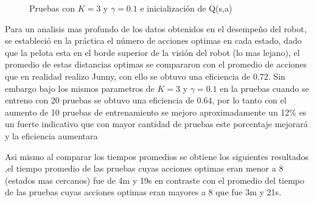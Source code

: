 \begin{figure}[h]
\caption{Pruebas con $K = 3$ y $ \gamma = 0.1 $ e inicializaci\'on de Q(s,a)}
\label{fig:mejor}
\end{figure} 

Para un analisis mas profundo de los datos obtenidos en el desempeño del robot, se estableci\'o en la pr\'actica el n\'umero de acciones optimas en cada estado, dado que la pelota esta en el borde superior de la visi\'on del robot (lo mas lejano), el promedio de estas distancias optimas se compararon con el promedio de acciones que en realidad realizo Junny, con ello se obtuvo una eficiencia de $ 0.72$. Sin embargo bajo los mismos parametros de  $K = 3$ y $ \gamma = 0.1 $ en la pruebas cuando se entreno con 20 pruebas se obtuvo una eficiencia de $0.64$, por lo tanto con el aumento de 10 pruebas de entrenamiento se mejoro aproximadamente un 12\% es un fuerte indicativo que con mayor cantidad de pruebas este porcentaje mejorar\'a y la eficiencia aumentara

Asi mismo al comparar los tiempos promedios se obtiene los siguientes resultados ,el tiempo promedio de las pruebas cuyas acciones optimas eran menor a 8 (estados mas cercanos) fue de 4m y 19s en contraste con el promedio del tiempo de las pruebas cuyas acciones optimas eran mayores a 8 que fue  3m y 21s.

 

   

